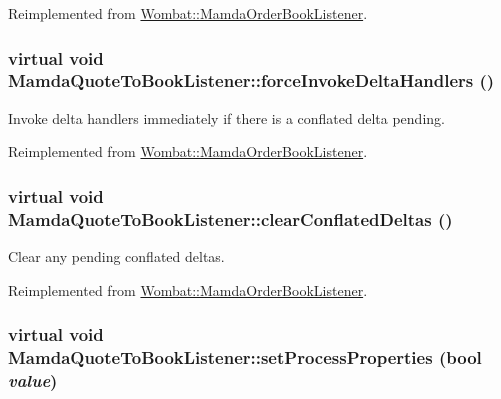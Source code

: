 Reimplemented from \hyperlink{classWombat_1_1MamdaOrderBookListener_408fe065eeefd1322fb3c2f78751e806}{Wombat::Mamda\-Order\-Book\-Listener}.\hypertarget{classMamdaQuoteToBookListener_a87a519f30dd56c678cc0a847e090d26}{
\subsubsection[forceInvokeDeltaHandlers]{\setlength{\rightskip}{0pt plus 5cm}virtual void Mamda\-Quote\-To\-Book\-Listener::force\-Invoke\-Delta\-Handlers ()}}
\label{classMamdaQuoteToBookListener_a87a519f30dd56c678cc0a847e090d26}


Invoke delta handlers immediately if there is a conflated delta pending. 



Reimplemented from \hyperlink{classWombat_1_1MamdaOrderBookListener_c3349c645be9a131ab64fc81ed203730}{Wombat::Mamda\-Order\-Book\-Listener}.\hypertarget{classMamdaQuoteToBookListener_ea724b9d69c544572dcfab7c8c002d18}{
\subsubsection[clearConflatedDeltas]{\setlength{\rightskip}{0pt plus 5cm}virtual void Mamda\-Quote\-To\-Book\-Listener::clear\-Conflated\-Deltas ()}}
\label{classMamdaQuoteToBookListener_ea724b9d69c544572dcfab7c8c002d18}


Clear any pending conflated deltas. 



Reimplemented from \hyperlink{classWombat_1_1MamdaOrderBookListener_46cdfacfe189842f46e8592eceff6724}{Wombat::Mamda\-Order\-Book\-Listener}.\hypertarget{classMamdaQuoteToBookListener_39b9f957b27047f5e15fdddaca242b91}{
\subsubsection[setProcessProperties]{\setlength{\rightskip}{0pt plus 5cm}virtual void Mamda\-Quote\-To\-Book\-Listener::set\-Process\-Properties (bool {\em value})}}
\label{classMamdaQuoteToBookListener_39b9f957b27047f5e15fdddaca242b91}


